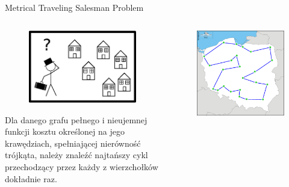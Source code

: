 \documentclass[final,hyperref={pdfpagelabels=false}]{beamer}
\begin{document}
\begin{frame}
  \begin{columns}
    \begin{column}{.46\textwidth}
      \begin{block}{Metrical Traveling Salesman Problem}
        \begin{minipage}{\linewidth}
          \begin{columns}
            \begin{column}{.38\linewidth}
              \begin{figure}
                \centering
                \includegraphics[width=0.9\linewidth]{stickman_salesman}
              \end{figure}
              Dla danego grafu pełnego i nieujemnej funkcji kosztu określonej na jego krawędziach, spełniającej nierówność trójkąta, należy znaleźć najtańszy
              cykl przechodzący przez każdy z wierzchołków dokładnie raz.
            \end{column}

            \begin{column}{.58\linewidth}
              \begin{figure}
                \centering
                \includegraphics[width=0.8\linewidth]{poland_cities_cycle}
              \end{figure}
            \end{column}


\end{columns}
\end{minipage}
\end{block}
\end{column}
\end{columns}
\end{frame}
\end{document}
